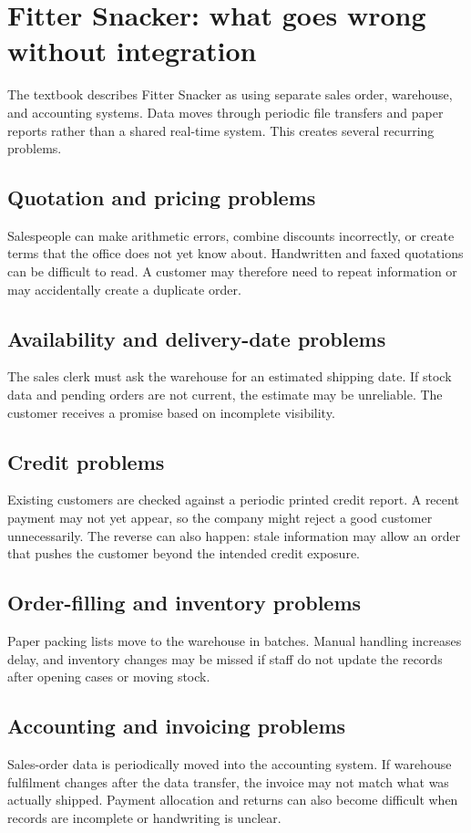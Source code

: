 \section{Fitter Snacker: what goes wrong without integration}

The textbook describes Fitter Snacker as using separate sales order, warehouse, and accounting systems. Data moves through periodic file transfers and paper reports rather than a shared real-time system. This creates several recurring problems.

\subsection{Quotation and pricing problems}
Salespeople can make arithmetic errors, combine discounts incorrectly, or create terms that the office does not yet know about. Handwritten and faxed quotations can be difficult to read. A customer may therefore need to repeat information or may accidentally create a duplicate order.

\subsection{Availability and delivery-date problems}
The sales clerk must ask the warehouse for an estimated shipping date. If stock data and pending orders are not current, the estimate may be unreliable. The customer receives a promise based on incomplete visibility.

\subsection{Credit problems}
Existing customers are checked against a periodic printed credit report. A recent payment may not yet appear, so the company might reject a good customer unnecessarily. The reverse can also happen: stale information may allow an order that pushes the customer beyond the intended credit exposure.

\subsection{Order-filling and inventory problems}
Paper packing lists move to the warehouse in batches. Manual handling increases delay, and inventory changes may be missed if staff do not update the records after opening cases or moving stock.

\subsection{Accounting and invoicing problems}
Sales-order data is periodically moved into the accounting system. If warehouse fulfilment changes after the data transfer, the invoice may not match what was actually shipped. Payment allocation and returns can also become difficult when records are incomplete or handwriting is unclear.

